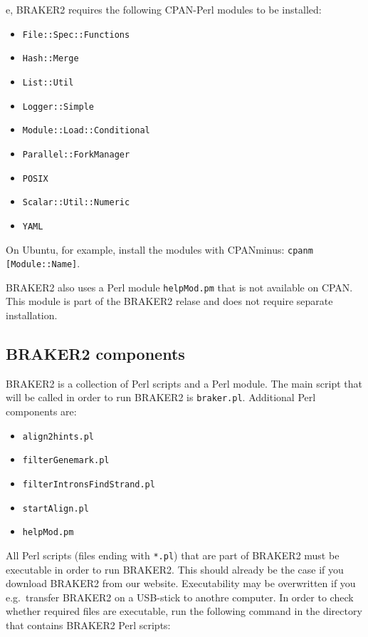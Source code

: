 \documentclass[a4paper,10pt]{report}
\begin{document}
e, BRAKER2 requires the following CPAN-Perl modules to be installed:

\begin{itemize}
 \item 		  \texttt{File::Spec::Functions}
				\item \texttt{Hash::Merge}
				\item \texttt{List::Util}
				\item \texttt{Logger::Simple}
				\item \texttt{Module::Load::Conditional}
				\item \texttt{Parallel::ForkManager}
				\item \texttt{POSIX}
				\item \texttt{Scalar::Util::Numeric}
				\item \texttt{YAML}
\end{itemize}

   	On Ubuntu, for example, install the modules with CPANminus: \texttt{cpanm [Module::Name]}.

   BRAKER2 also uses a Perl module \texttt{helpMod.pm} that is not available on CPAN. This module is 
   part of the BRAKER2 relase and does not require separate installation.  

\subsection{BRAKER2 components} \label{Executability}

BRAKER2 is a collection of Perl scripts and a Perl module. The main script that will be called in order to run BRAKER2 is \texttt{braker.pl}. Additional Perl components are:

\begin{itemize}
\item \texttt{align2hints.pl}
\item \texttt{filterGenemark.pl}
\item \texttt{filterIntronsFindStrand.pl}
\item \texttt{startAlign.pl}
\item \texttt{helpMod.pm}
\end{itemize}

All Perl scripts (files ending with \texttt{*.pl}) that are part of BRAKER2 must be executable in order to run BRAKER2. This should already be the case if you download BRAKER2 from our website. Executability may be overwritten if you e.g.~transfer BRAKER2 on a USB-stick to anothre computer. In order to check whether required files are executable, run the following command in the directory that contains BRAKER2 Perl scripts:
\end{document}
